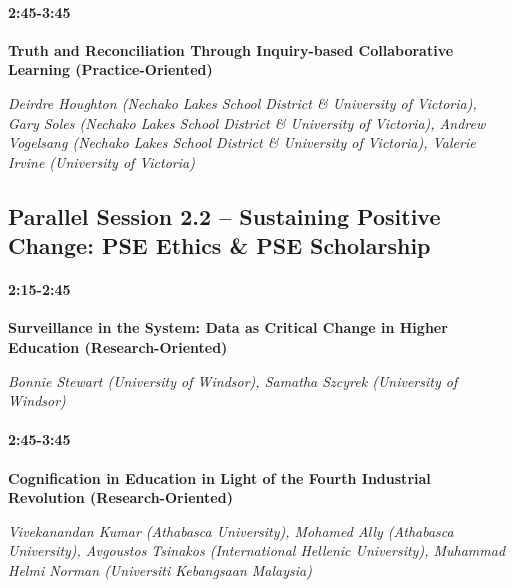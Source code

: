 \documentclass[
]{book}
\begin{document}
\begin{secondary}
\hypertarget{section}{%
\paragraph*{2:45-3:45}\label{section}}

\textbf{Truth and Reconciliation Through Inquiry-based Collaborative
Learning (Practice-Oriented)}

\emph{Deirdre Houghton (Nechako Lakes School District \& University of
Victoria), Gary Soles (Nechako Lakes School District \& University of
Victoria), Andrew Vogelsang (Nechako Lakes School District \& University
of Victoria), Valerie Irvine (University of Victoria)}
\end{secondary}

\hypertarget{parallel-session-2.2-sustaining-positive-change-pse-ethics-pse-scholarship}{%
\subsection*{Parallel Session 2.2 -- Sustaining Positive Change: PSE Ethics \& PSE Scholarship}\label{parallel-session-2.2-sustaining-positive-change-pse-ethics-pse-scholarship}}

\begin{secondary}
\hypertarget{section}{%
\paragraph*{2:15-2:45}\label{section}}

\textbf{Surveillance in the System: Data as Critical Change in Higher
Education (Research-Oriented)}

\emph{Bonnie Stewart (University of Windsor), Samatha Szcyrek
(University of Windsor)}
\end{secondary}

\begin{secondary}
\hypertarget{section}{%
\paragraph*{2:45-3:45}\label{section}}

\textbf{Cognification in Education in Light of the Fourth Industrial
Revolution (Research-Oriented)}

\emph{Vivekanandan Kumar (Athabasca University), Mohamed Ally (Athabasca
University), Avgoustos Tsinakos (International Hellenic University),
Muhammad Helmi Norman (Universiti Kebangsaan Malaysia)}
\end{secondary}
\end{document}
